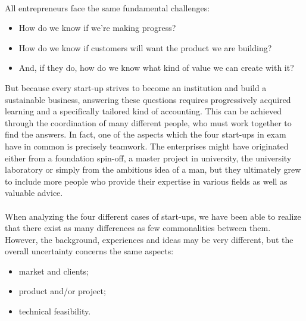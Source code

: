 \documentclass[twoside]{report}
\begin{document}
\paragraph{}
\cite{ries_is_2010}
All entrepreneurs face the same fundamental challenges:
\begin{itemize}
\item How do we know if we're making progress?
\item How do we know if customers will want the product we are building?
\item And, if they do, how do we know what kind of value we can create with it? 
\end{itemize}
But because every start-up strives to become an institution and build a sustainable business, answering these questions requires progressively acquired learning and a specifically tailored kind of accounting. This can be achieved through the coordination of many different people, who must work together to find the answers. In fact, one of the aspects which the four start-ups in exam have in common is precisely teamwork. The enterprises might have originated either from a foundation spin-off, a master project in university, the university laboratory or simply from the ambitious idea of a man, but they ultimately grew to include more people who provide their expertise in various fields as well as valuable advice. 
\paragraph{}
When analyzing the four different cases of start-ups, we have been able to realize that there exist as many differences as few commonalities between them. However, the background, experiences and ideas may be very different, but the overall uncertainty concerns the same aspects:
\begin{itemize}
\item market and clients;
\item product and/or project;
\item technical feasibility.
\end{itemize}
\end{document}
